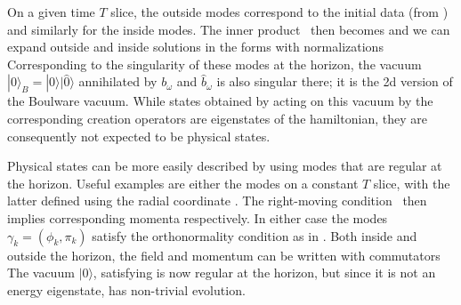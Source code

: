 On a given time $T$ slice, the outside modes correspond to the initial data (from \RMp)
%
\eqn{}
%
and similarly for the inside modes.
The inner product \normdef\ then becomes
%
\eqn{}
%
and we can expand outside and inside solutions in the forms
%
\eqn{}
%
 with normalizations
%
\eqn{}
%
Corresponding to the singularity of these modes at the horizon, the vacuum $|0\rangle_B=|0\rangle|\hat 0\rangle$ annihilated by $b_\omega$ and $\hat b_\omega$ is also singular there; it is the 2d version of the Boulware vacuum.  While states obtained by acting on this vacuum by the corresponding creation operators are eigenstates of the hamiltonian, they are consequently  not expected to be physical states.


Physical states can be more easily described by using modes that are regular at the horizon.  Useful examples are either the modes 
%
\eqn{}
%
on a constant $T$ slice, with the latter defined using the radial coordinate \rhodef.  The right-moving condition \RMp\ then implies corresponding momenta
%
\eqn{}
%
respectively.  In either case the modes $\gamma_k=(\phi_k,\pi_k)$ satisfy the orthonormality condition
%
\eqn{}
%
as in \omprod. Both inside and outside the horizon, the field and momentum can be written
%
\eqn{}
%
with commutators
%
\eqn{}
%
The vacuum $|0\rangle$, satisfying
%
\eqn{}
%
is now regular at the horizon, but since it is not an energy eigenstate, has non-trivial evolution.

